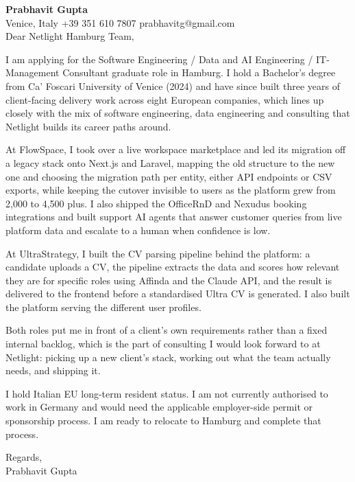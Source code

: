\documentclass[a4paper,10.5pt]{article}
\begin{document}
\textbf{Prabhavit Gupta}\\
Venice, Italy \textbar{} +39 351 610 7807 \textbar{} prabhavitg@gmail.com\\[10pt]
Dear Netlight Hamburg Team,

I am applying for the Software Engineering / Data and AI Engineering / IT-Management Consultant graduate role in Hamburg. I hold a Bachelor's degree from Ca' Foscari University of Venice (2024) and have since built three years of client-facing delivery work across eight European companies, which lines up closely with the mix of software engineering, data engineering and consulting that Netlight builds its career paths around.

At FlowSpace, I took over a live workspace marketplace and led its migration off a legacy stack onto Next.js and Laravel, mapping the old structure to the new one and choosing the migration path per entity, either API endpoints or CSV exports, while keeping the cutover invisible to users as the platform grew from 2,000 to 4,500 plus. I also shipped the OfficeRnD and Nexudus booking integrations and built support AI agents that answer customer queries from live platform data and escalate to a human when confidence is low.

At UltraStrategy, I built the CV parsing pipeline behind the platform: a candidate uploads a CV, the pipeline extracts the data and scores how relevant they are for specific roles using Affinda and the Claude API, and the result is delivered to the frontend before a standardised Ultra CV is generated. I also built the platform serving the different user profiles.

Both roles put me in front of a client's own requirements rather than a fixed internal backlog, which is the part of consulting I would look forward to at Netlight: picking up a new client's stack, working out what the team actually needs, and shipping it.

I hold Italian EU long-term resident status. I am not currently authorised to work in Germany and would need the applicable employer-side permit or sponsorship process. I am ready to relocate to Hamburg and complete that process.

Regards,\\
Prabhavit Gupta
\end{document}
